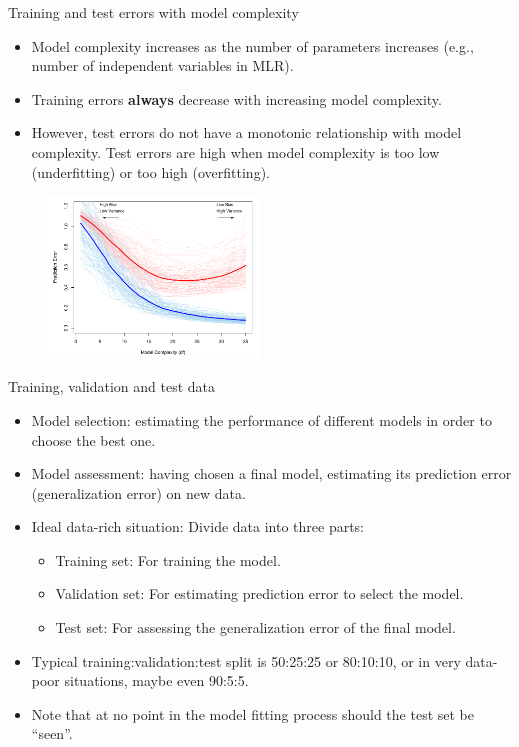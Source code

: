 \documentclass[aspectratio=169]{beamer}
\begin{document}
\begin{frame}{Training and test errors with model complexity}
    \begin{itemize}
        \item Model complexity increases as the number of parameters increases (e.g., number of independent variables in MLR). 
        \item Training errors \textbf{always} decrease with increasing model complexity.
        \item However, test errors do not have a monotonic relationship with model complexity. Test errors are high when model complexity is too low (underfitting) or too high (overfitting).
    \end{itemize}
    \begin{figure}
        \centering
        \includegraphics[width=0.5\textwidth]{figures/fig7-1.pdf}
    \end{figure}
\end{frame}


\begin{frame}{Training, validation and test data}
    \begin{itemize}
        \item Model selection: estimating the performance of different models in order to choose the best one.
        \item Model assessment: having chosen a final model, estimating its prediction error (generalization error) on new data.
        \item Ideal data-rich situation: Divide data into three parts:
        \begin{itemize}
            \item Training set: For training the model.
            \item Validation set: For estimating prediction error to select the model.
            \item Test set: For assessing the generalization error of the final model.
        \end{itemize}
        \item Typical training:validation:test split is 50:25:25 or 80:10:10, or in very data-poor situations, maybe even 90:5:5.
        \item Note that at no point in the model fitting process should the test set be ``seen''.
    \end{itemize}
\end{frame}
\end{document}
